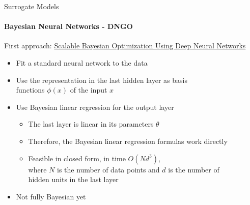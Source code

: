 \begin{frame}[c]{Surrogate Models}
\framesubtitle{Bayesian Neural Networks - DNGO}

First approach: \href{https://arxiv.org/pdf/1502.05700.pdf}{Scalable Bayesian Optimization Using Deep Neural Networks}

\begin{itemize}
    \item Fit a standard neural network to the data 
    \item Use the representation in the last hidden layer as basis \\ functions $\phi(x)$ of the input $x$ 
    \item Use Bayesian linear regression for the output layer \pause
    \begin{itemize}
        \item The last layer is linear in its parameters $\theta$  
        \item Therefore, the Bayesian linear regression formulas work directly 
        \item Feasible in closed form, in time $O(N d^3)$, \\ where $N$ is the number of data points and $d$ is the number of \\ hidden units in the last layer 
    \end{itemize}
    \item Not fully Bayesian yet
\end{itemize}

\vspace{1cm}
\hspace{12cm}

\end{frame}
